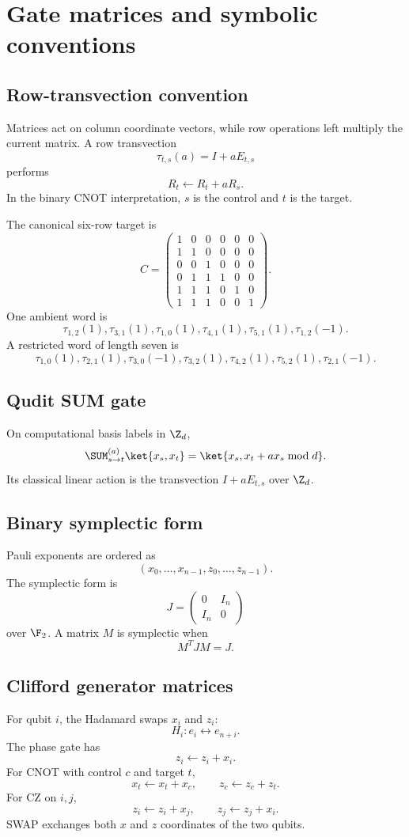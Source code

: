 \chapter{Gate matrices and symbolic conventions}\label{app:gate-matrices}


\section{Row-transvection convention}
Matrices act on column coordinate vectors, while row operations left multiply the current matrix.  A row transvection
\[
\tau_{t,s}(a)=I+aE_{t,s}
\]
performs
\[
R_t\leftarrow R_t+aR_s.
\]
In the binary CNOT interpretation, $s$ is the control and $t$ is the target.

The canonical six-row target is
\[
C=
\begin{pmatrix}
1&0&0&0&0&0\\
1&1&0&0&0&0\\
0&0&1&0&0&0\\
0&1&1&1&0&0\\
1&1&1&0&1&0\\
1&1&1&0&0&1
\end{pmatrix}.
\]
One ambient word is
\[
\tau_{1,2}(1),
\tau_{3,1}(1),
\tau_{1,0}(1),
\tau_{4,1}(1),
\tau_{5,1}(1),
\tau_{1,2}(-1).
\]
A restricted word of length seven is
\[
\tau_{1,0}(1),
\tau_{2,1}(1),
\tau_{3,0}(-1),
\tau_{3,2}(1),
\tau_{4,2}(1),
\tau_{5,2}(1),
\tau_{2,1}(-1).
\]

\section{Qudit SUM gate}
On computational basis labels in $\Z_d$,
\[
\SUM^{(a)}_{s\to t}
\ket{x_s,x_t}
=
\ket{x_s,x_t+a x_s\bmod d}.
\]
Its classical linear action is the transvection $I+aE_{t,s}$ over $\Z_d$.

\section{Binary symplectic form}
Pauli exponents are ordered as
\[
(x_0,\ldots,x_{n-1},z_0,\ldots,z_{n-1}).
\]
The symplectic form is
\[
J=
\begin{pmatrix}
0&I_n\\
I_n&0
\end{pmatrix}
\]
over $\F_2$.  A matrix $M$ is symplectic when
\[
M^TJM=J.
\]

\section{Clifford generator matrices}
For qubit $i$, the Hadamard swaps $x_i$ and $z_i$:
\[
H_i:e_i\leftrightarrow e_{n+i}.
\]
The phase gate has
\[
z_i\leftarrow z_i+x_i.
\]
For CNOT with control $c$ and target $t$,
\[
x_t\leftarrow x_t+x_c,
\qquad
z_c\leftarrow z_c+z_t.
\]
For CZ on $i,j$,
\[
z_i\leftarrow z_i+x_j,
\qquad
z_j\leftarrow z_j+x_i.
\]
SWAP exchanges both $x$ and $z$ coordinates of the two qubits.

